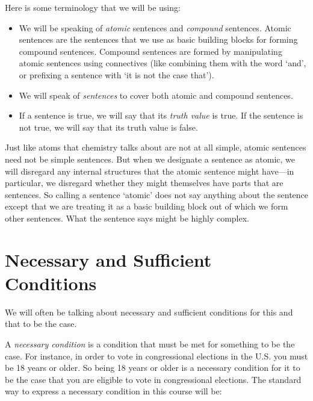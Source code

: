 Here is some terminology that we will be using:
\begin{itemize}

 \item We will be speaking of \emph{atomic} sentences and \emph{compound} 
  sentences. Atomic sentences are the sentences that we use as basic building 
  blocks for forming compound sentences. Compound sentences are formed by 
  manipulating atomic sentences using connectives (like combining them with the 
  word `and', or prefixing a sentence with `it is not the case that').  

\item We will speak of \emph{sentences} to cover both atomic and compound 
 sentences.

 \item If a sentence is true, we will say that its \emph{truth value} is true.  
  If the sentence is not true, we will say that its truth value is false.

\end{itemize}

Just like atoms that chemistry talks about are not at all simple, atomic 
sentences need not be simple sentences.  But when we designate a sentence as 
atomic, we will disregard any internal structures that the atomic sentence might 
have---in particular, we disregard whether they might themselves have parts that 
are sentences. So calling a sentence `atomic' does not say anything about the 
sentence except that we are treating it as a basic building block out of which 
we form other sentences. What the sentence says might be highly complex.






\section{Necessary and Sufficient Conditions}

We will often be talking about necessary and sufficient conditions for this and 
that to be the case.

A \emph{necessary condition} is a condition that must be met for something to be 
the case.  For instance, in order to vote in congressional elections in the U.S.  
you must be 18 years or older. So being 18 years or older is a necessary 
condition for it to  be the case that you are eligible to vote in congressional 
elections.  The standard way to express a necessary condition in this course 
will be:

